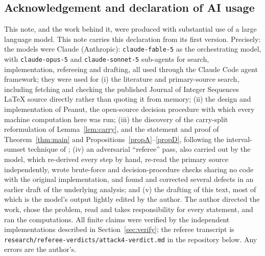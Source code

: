 \documentclass[10pt,reqno]{amsart}
\theoremstyle{plain}
\theoremstyle{definition}
\theoremstyle{remark}
\numberwithin{theorem}{section}
\begin{document}
\subsection*{Acknowledgement and declaration of AI usage}
This note, and the work behind it, were produced with substantial use of a large language
model. This note carries this declaration from its first version. Precisely: the models were Claude (Anthropic): \texttt{claude-fable-5} as the orchestrating model, with \texttt{claude-opus-5} and \texttt{claude-sonnet-5} sub-agents for search, implementation, refereeing and drafting, all used through the Claude Code agent framework; they were used for (i) the literature and primary-source search, including
fetching and checking the published Journal of Integer Sequences LaTeX source directly rather
than quoting it from memory; (ii) the design and implementation of Peanut, the open-source
decision procedure with which every machine computation here was run; (iii) the discovery of
the carry-split reformulation of Lemma~\ref{lem:carry}, and the statement and proof of
Theorem~\ref{thm:main} and Propositions~\ref{propA}--\ref{propD}, following the interval-sumset
technique of \cite{Shtrezi}; (iv) an adversarial ``referee'' pass, also carried out by the
model, which re-derived every step by hand, re-read the primary source independently, wrote
brute-force and decision-procedure checks sharing no code with the original implementation,
and found and corrected several defects in an earlier draft of the underlying analysis; and
(v) the drafting of this text, most of which is the model's output lightly edited by the
author. The author directed the work, chose the problem, read and takes responsibility for
every statement, and ran the computations. All finite claims were verified by the independent
implementations described in Section~\ref{sec:verify}; the referee transcript is
\texttt{research/referee-verdicts/attack4-verdict.md} in the repository below. Any errors are the author's.
\end{document}
